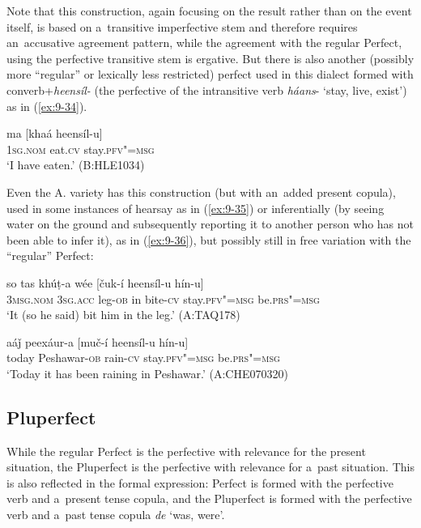Note that this construction, again focusing on the result rather than on the event itself, is based on a~transitive imperfective stem and therefore requires an~accusative agreement pattern, while the agreement with the regular Perfect, using the perfective transitive stem is ergative. But there is also another (possibly more ``regular'' or lexically less restricted) perfect used in this dialect formed with converb+\textit{heensíl-} (the perfective of the intransitive verb \textit{háans}- `stay, live, exist') as in (\ref{ex:9-34}).

\begin{exe}
\ex
\label{ex:9-34}
\gll ma [khaá heensíl-u]  \\
\textsc{1sg.nom} eat.\textsc{cv} stay.\textsc{pfv"=msg} \\
\glt `I have eaten.' (B:HLE1034)
\end{exe}

Even the A. variety has this construction (but with an~added present copula), used in some instances of hearsay as in (\ref{ex:9-35}) or inferentially (by seeing water on the ground and subsequently reporting it to another person who has not been able to infer it), as in (\ref{ex:9-36}), but possibly still in free variation with the ``regular'' Perfect:

\begin{exe}
\ex
\label{ex:9-35}
\gll so tas khúṭ-a wée [čuk-í heensíl-u hín-u] \\
\textsc{3msg.nom} \textsc{3sg.acc} leg-\textsc{ob} in bite-\textsc{cv} stay.\textsc{pfv"=msg} be.\textsc{prs"=msg} \\
\glt `It (so he said) bit him in the leg.' (A:TAQ178)

\ex
\label{ex:9-36}
\gll aáǰ peexáur-a [muč-í heensíl-u hín-u]  \\
today Peshawar-\textsc{ob} rain-\textsc{cv} stay.\textsc{pfv"=msg} be.\textsc{prs"=msg} \\
\glt `Today it has been raining in Peshawar.' (A:CHE070320)
\end{exe}

\subsection{Pluperfect}
\label{subsec:9-1-8}

While the regular Perfect is the perfective with relevance for the present situation, the Pluperfect is the perfective with relevance for a~past situation. This is also reflected in the formal expression: Perfect is formed with the perfective verb and a~present tense copula, and the Pluperfect is formed with the perfective verb and a~past tense copula \textit{de} `was, were'. 


